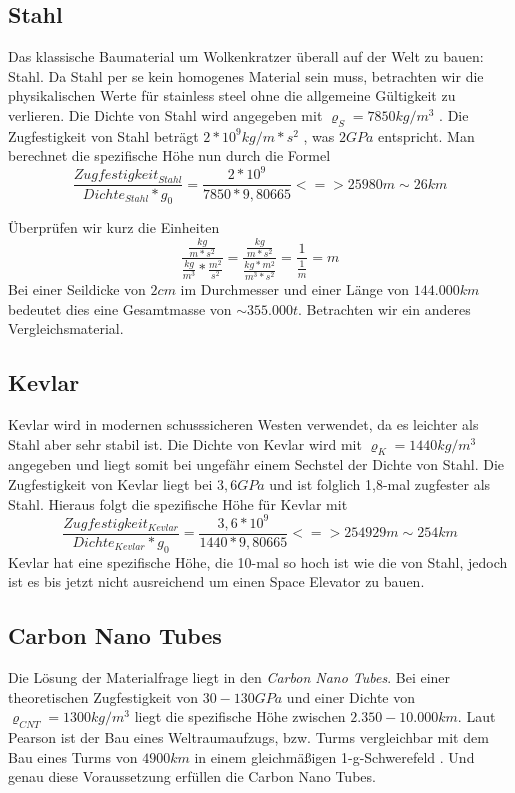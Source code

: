 \documentclass[a4paper, 10pt]{report}
\begin{document}
\subsection{Stahl}
Das klassische Baumaterial um Wolkenkratzer überall auf der Welt zu bauen: Stahl. Da Stahl per se kein homogenes Material sein muss, betrachten wir die physikalischen Werte für stainless steel ohne die allgemeine Gültigkeit zu verlieren. Die Dichte von Stahl wird angegeben mit $\varrho_S = 7850 kg/m^3$ \cite[Vgl.]{PE75}. Die Zugfestigkeit von Stahl beträgt $2*10^9 kg/m*s^2$ , was $2GPa$ entspricht. Man berechnet die spezifische Höhe nun durch die Formel 
\begin{equation}
\frac{Zugfestigkeit_{Stahl}}{Dichte_{Stahl}*g_0} = \frac{2*10^9}{7850*9,80665}
<=> 25 980 m \sim 26 km 
\end{equation}

Überprüfen wir kurz die Einheiten
\begin{equation}
\frac{\frac{kg}{m*s^2}}{\frac{kg}{m^3}*\frac{m^2}{s^2}}= \frac{\frac{kg}{m*s^2}}{\frac{kg*m^2}{m^3*s^2}} = \frac{1}{\frac{1}{m}} = m
\end{equation}
Bei einer Seildicke von $2 cm$ im Durchmesser und einer Länge von $144.000 km$ bedeutet dies eine Gesamtmasse von $\sim 355.000 t$.\cite{PE75}
Betrachten wir ein anderes Vergleichsmaterial.
\subsection{Kevlar}
Kevlar wird in modernen schusssicheren Westen verwendet, da es leichter als Stahl aber sehr stabil ist. Die Dichte von Kevlar wird mit $\varrho_K = 1440 kg/m^3$ angegeben und liegt somit bei ungefähr einem Sechstel der Dichte von Stahl. Die Zugfestigkeit von Kevlar liegt bei $3,6 GPa$ und ist folglich 1,8-mal zugfester als Stahl. Hieraus folgt die spezifische Höhe für Kevlar mit
\begin{equation}
\frac{Zugfestigkeit_{Kevlar}}{Dichte_{Kevlar}*g_0} = \frac{3,6*10^9}{1440*9,80665}
<=> 254 929 m \sim 254 km 
\end{equation}
Kevlar hat eine spezifische Höhe, die 10-mal so hoch ist wie die von Stahl, jedoch ist es bis jetzt nicht ausreichend um einen Space Elevator zu bauen. \cite{PE75}
\subsection{Carbon Nano Tubes}
Die Lösung der Materialfrage liegt in den \textsl{Carbon Nano Tubes}.
Bei einer theoretischen Zugfestigkeit von $30 - 130 GPa$ und einer Dichte von $\varrho_{CNT} = 1300 kg/m^3$ liegt die spezifische Höhe zwischen $2.350 - 10.000 km$. Laut Pearson ist der Bau eines Weltraumaufzugs, bzw. Turms vergleichbar mit dem Bau eines Turms von $4900 km$ in einem gleichmäßigen 1-g-Schwerefeld \cite{PE75}. Und genau diese Voraussetzung erfüllen die Carbon Nano Tubes.
\end{document}
